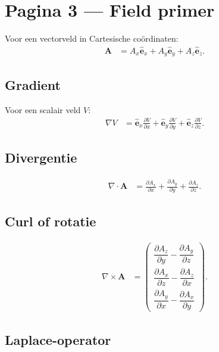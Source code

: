 \documentclass[11pt]{article}
\newcommand{\vect}[1]{\mathbf{#1}}
\begin{document}
\section*{Pagina 3 --- Field primer}

Voor een vectorveld in Cartesische coördinaten:
\begin{align*}
\vect{A}
  &=
  A_x\hat{\vect{e}}_x
  +A_y\hat{\vect{e}}_y
  +A_z\hat{\vect{e}}_z.
\end{align*}

\subsection*{Gradient}

Voor een scalair veld $V$:
\begin{align*}
\nabla V
  &=
  \hat{\vect{e}}_x\frac{\partial V}{\partial x}
  +\hat{\vect{e}}_y\frac{\partial V}{\partial y}
  +\hat{\vect{e}}_z\frac{\partial V}{\partial z}.
\end{align*}

\subsection*{Divergentie}

\begin{align*}
\nabla\cdot\vect{A}
  &=
  \frac{\partial A_x}{\partial x}
  +\frac{\partial A_y}{\partial y}
  +\frac{\partial A_z}{\partial z}.
\end{align*}

\subsection*{Curl of rotatie}

\begin{align*}
\nabla\times\vect{A}
  &=
  \begin{pmatrix}
  \dfrac{\partial A_z}{\partial y}
    -\dfrac{\partial A_y}{\partial z}\\[0.9em]
  \dfrac{\partial A_x}{\partial z}
    -\dfrac{\partial A_z}{\partial x}\\[0.9em]
  \dfrac{\partial A_y}{\partial x}
    -\dfrac{\partial A_x}{\partial y}
  \end{pmatrix}.
\end{align*}

\subsection*{Laplace-operator}
\end{document}
